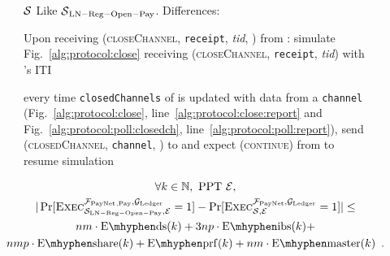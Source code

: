 \begin{figure}[!htbp]
  \begin{simulatorbox}{$\mathcal{S}$}
    Like $\mathcal{S}{}_{\mathrm{LN - Reg - Open - Pay}}$. Differences:
    \begin{algorithmic}[1]
      \State Upon receiving (\textsc{closeChannel}, \texttt{receipt},
      \textit{tid}, \alice) from \fpaynet:
      \Indent
        \State simulate Fig.~\ref{alg:protocol:close} receiving
        (\textsc{closeChannel}, \texttt{receipt}, \textit{tid}) with \alice's
        ITI
      \EndIndent
      \Statex

      \State every time \texttt{closedChannels} of \alice{} is updated with
      data from a \texttt{channel} (Fig.~\ref{alg:protocol:close},
      line~\ref{alg:protocol:close:report} and
      Fig.~\ref{alg:protocol:poll:closedch},
      line~\ref{alg:protocol:poll:report}), send (\textsc{closedChannel},
      \texttt{channel}, \alice) to \fpaynet{} and expect (\textsc{continue})
      from \fpaynet{} to resume simulation
      \label{alg:sim:close:report}
    \end{algorithmic}
  \end{simulatorbox}
  \caption{}
  \label{alg:sim:close}
\end{figure}

\begin{lemma}
  \label{lemma:close}
  \begin{gather*}
    \forall k \in \mathbb{N}, \text{ PPT } \environment, \\
    |\Pr[\textsc{Exec}^{\fpaynet{}_{\mathrm{, Pay}},
    \ledger}_{\simulator_{\mathrm{LN - Reg - Open - Pay}}, \environment} = 1] -
    \Pr[\textsc{Exec}^{\fpaynet, \ledger}_{\simulator, \environment} = 1]| \leq
    \\
    nm \cdot \mathrm{E \mhyphen ds}(k) + 3np \cdot \mathrm{E \mhyphen ibs}(k) +
    \\
    nmp \cdot \mathrm{E \mhyphen share}(k) + \mathrm{E \mhyphen prf}(k) + nm
    \cdot \mathrm{E \mhyphen master}(k) \enspace.
  \end{gather*}
\end{lemma}

